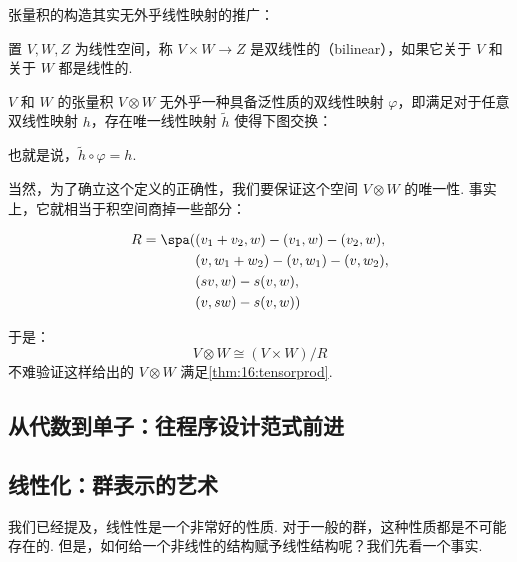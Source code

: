 张量积的构造其实无外乎线性映射的推广：

\begin{definition}
    置 $V, W, Z$ 为线性空间，称 $V \times W \to Z$ 是双线性的（bilinear），如果它关于 $V$ 和关于 $W$ 都是线性的.
\end{definition}

\begin{definition} \label{thm:16:tensorprod}
    $V$ 和 $W$ 的张量积 $V \otimes W$ 无外乎一种具备泛性质的双线性映射 $\varphi$，即满足对于任意双线性映射 $h$，存在唯一线性映射 $\widetilde h$ 使得下图交换：

    \begin{center}
    \end{center}

    也就是说，$\widetilde h \circ \varphi = h$.
\end{definition}

当然，为了确立这个定义的正确性，我们要保证这个空间 $V \otimes W$ 的唯一性. 事实上，它就相当于积空间商掉一些部分：

\begin{align*}
    R = \spa ( & (v_1 + v_2, w) - (v_1, w) - (v_2, w), \\
               & (v, w_1 + w_2) - (v, w_1) - (v, w_2), \\
               & (sv, w) - s(v, w),                    \\
               & (v, sw) - s(v, w))
\end{align*}

于是：
\[ V \otimes W \cong (V \times W) / R \]
不难验证这样给出的 $V \otimes W$ 满足\autoref{thm:16:tensorprod}.

\subsection{从代数到单子：往程序设计范式前进}

\subsection{线性化：群表示的艺术}

我们已经提及，线性性是一个非常好的性质. 对于一般的群，这种性质都是不可能存在的. 但是，如何给一个非线性的结构赋予线性结构呢？我们先看一个事实.

